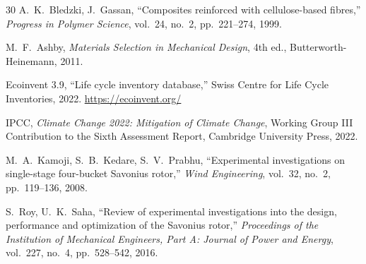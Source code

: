 \documentclass[twocolumn]{article}
\begin{document}
\begin{thebibliography}{30}
A.~K.~Bledzki, J.~Gassan, ``Composites reinforced with cellulose-based fibres,'' \textit{Progress in Polymer Science}, vol.~24, no.~2, pp.~221--274, 1999.

M.~F.~Ashby, \textit{Materials Selection in Mechanical Design}, 4th ed., Butterworth-Heinemann, 2011.

Ecoinvent 3.9, ``Life cycle inventory database,'' Swiss Centre for Life Cycle Inventories, 2022. \url{https://ecoinvent.org/}

IPCC, \textit{Climate Change 2022: Mitigation of Climate Change}, Working Group III Contribution to the Sixth Assessment Report, Cambridge University Press, 2022.

M.~A.~Kamoji, S.~B.~Kedare, S.~V.~Prabhu, ``Experimental investigations on single-stage four-bucket Savonius rotor,'' \textit{Wind Engineering}, vol.~32, no.~2, pp.~119--136, 2008.

S.~Roy, U.~K.~Saha, ``Review of experimental investigations into the design, performance and optimization of the Savonius rotor,'' \textit{Proceedings of the Institution of Mechanical Engineers, Part A: Journal of Power and Energy}, vol.~227, no.~4, pp.~528--542, 2016.

\end{thebibliography}
\end{document}
